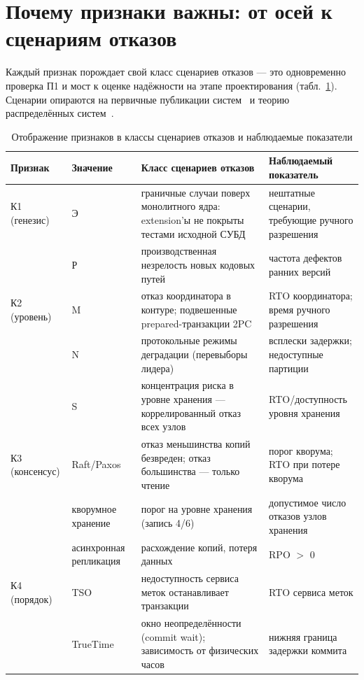 \documentclass{misisarticle}
\begin{document}
\section{Почему признаки важны: от осей к сценариям отказов}

Каждый признак порождает свой класс сценариев отказов --- это одновременно проверка П1 и мост к оценке надёжности на этапе проектирования (табл.~\ref{tab:faults}). Сценарии опираются на первичные публикации систем~\cite{spanner,crdb,tidb,aurora} и теорию распределённых систем~\cite{kleppmann,ozsu,abadi,bailis}.

\begin{table}[t]
\caption{Отображение признаков в классы сценариев отказов и наблюдаемые показатели}\label{tab:faults}
\centering
\footnotesize
\begin{tabular}{>{\raggedright\arraybackslash}p{1.6cm}>{\raggedright\arraybackslash}p{3.2cm}>{\raggedright\arraybackslash}p{7.4cm}>{\raggedright\arraybackslash}p{4.4cm}}
\toprule
\textbf{Признак} & \textbf{Значение} & \textbf{Класс сценариев отказов} & \textbf{Наблюдаемый показатель} \\
\midrule
К1 (генезис) & Э & граничные случаи поверх монолитного ядра: extension'ы не покрыты тестами исходной СУБД & нештатные сценарии, требующие ручного разрешения \\
 & Р & производственная незрелость новых кодовых путей & частота дефектов ранних версий \\
К2 (уровень) & M & отказ координатора в контуре; подвешенные prepared-транзакции 2PC & RTO координатора; время ручного разрешения \\
 & N & протокольные режимы деградации (перевыборы лидера) & всплески задержки; недоступные партиции \\
 & S & концентрация риска в уровне хранения --- коррелированный отказ всех узлов & RTO/доступность уровня хранения \\
К3 (консенсус) & Raft/Paxos & отказ меньшинства копий безвреден; отказ большинства --- только чтение & порог кворума; RTO при потере кворума \\
 & кворумное хранение & порог на уровне хранения (запись 4/6) & допустимое число отказов узлов хранения \\
 & асинхронная репликация & расхождение копий, потеря данных & RPO $>$ 0 \\
К4 (порядок) & TSO & недоступность сервиса меток останавливает транзакции & RTO сервиса меток \\
 & TrueTime & окно неопределённости (commit wait); зависимость от физических часов & нижняя граница задержки коммита \\

\end{tabular}
\end{table}
\end{document}

